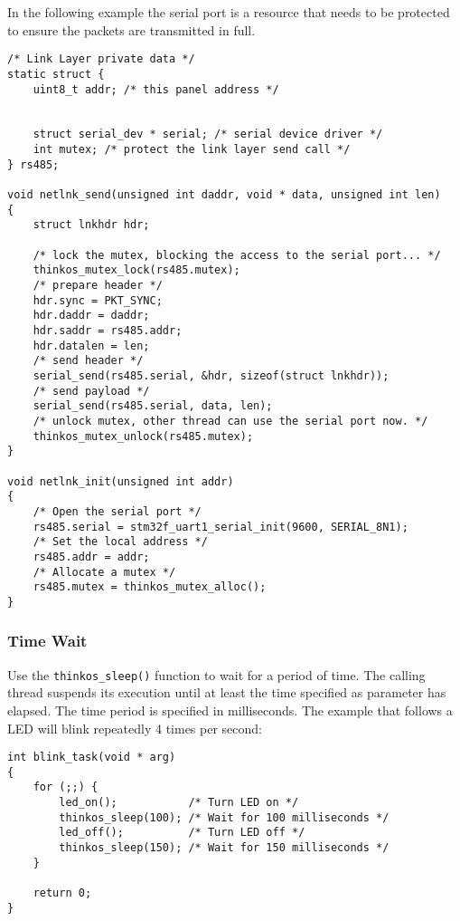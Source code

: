 In the following example the serial port is a resource that needs to be protected to ensure the packets are transmitted in full.


\begin{lstlisting}[caption={Using MutExes examples},label={lst:example3},language=C99,frame=single]
/* Link Layer private data */
static struct {
	uint8_t addr; /* this panel address */
	
	
    struct serial_dev * serial; /* serial device driver */
    int mutex; /* protect the link layer send call */
} rs485;

void netlnk_send(unsigned int daddr, void * data, unsigned int len)
{
    struct lnkhdr hdr;

    /* lock the mutex, blocking the access to the serial port... */
    thinkos_mutex_lock(rs485.mutex);
    /* prepare header */
    hdr.sync = PKT_SYNC;
    hdr.daddr = daddr;
    hdr.saddr = rs485.addr;
    hdr.datalen = len;
    /* send header */
    serial_send(rs485.serial, &hdr, sizeof(struct lnkhdr));
    /* send payload */
    serial_send(rs485.serial, data, len);
    /* unlock mutex, other thread can use the serial port now. */
    thinkos_mutex_unlock(rs485.mutex);
}

void netlnk_init(unsigned int addr)
{
    /* Open the serial port */
    rs485.serial = stm32f_uart1_serial_init(9600, SERIAL_8N1);
    /* Set the local address */
    rs485.addr = addr;
    /* Allocate a mutex */
    rs485.mutex = thinkos_mutex_alloc();
}
\end{lstlisting}

\subsubsection{Time Wait}

Use the \lstinline{thinkos_sleep()} function to wait for a period of time. The calling thread suspends its execution until at least the time specified as parameter has elapsed. The time period is specified in milliseconds.
The example that follows a LED will blink repeatedly 4 times per second:

\begin{lstlisting}[caption={Time Wait Example},label={lst:example4},language=C99,frame=single]
int blink_task(void * arg)
{
    for (;;) {
        led_on();           /* Turn LED on */
        thinkos_sleep(100); /* Wait for 100 milliseconds */
        led_off();          /* Turn LED off */
        thinkos_sleep(150); /* Wait for 150 milliseconds */
    }

    return 0;
}
\end{lstlisting}

